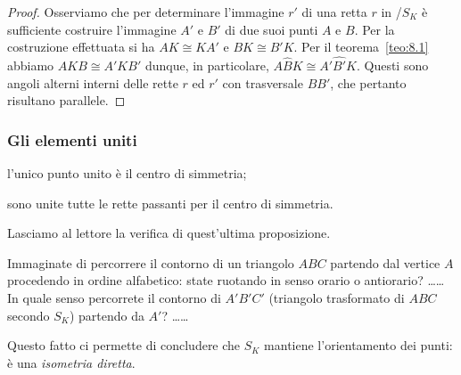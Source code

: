 \noindent\begin{minipage}{0.65\textwidth}\parindent15pt
\begin{proof}
Osserviamo che per determinare l'immagine \(r'\) di una retta \(r\) in 
/\(S_K\) è sufficiente costruire l'immagine \(A'\) e \(B'\) di due suoi 
punti \(A\) e \(B\). Per la costruzione effettuata si ha \(AK\cong KA'\) e 
\(BK\cong B'K\). Per il teorema~\ref{teo:8.1} abbiamo \(AKB\cong A'KB'\) 
dunque, in particolare, \(A\widehat{B}K\cong A'\widehat{B'}K\). Questi 
sono angoli alterni interni delle rette \(r\) ed \(r'\) con trasversale 
\(BB'\), che pertanto risultano parallele.
\end{proof}
\end{minipage}\hfil
\begin{minipage}{0.35\textwidth}
	
\centering
\end{minipage}\vspace{8pt}

\subsubsection{Gli elementi uniti}
\begin{itemize*}
\item l'unico punto unito è il centro di simmetria;
\item sono unite tutte le rette passanti per il centro di simmetria.
\end{itemize*}
Lasciamo al lettore la verifica di quest'ultima 
proposizione.\vspace{8pt}

Immaginate di percorrere il contorno di un triangolo \(ABC\) partendo 
dal vertice \(A\) procedendo in ordine alfabetico: state ruotando in 
senso orario o antiorario? \ldots\ldots{} In quale senso percorrete 
il contorno di \(A'B'C'\) (triangolo trasformato di \(ABC\) secondo 
\(S_K\)) partendo da \(A'\)? \ldots\ldots{}

Questo fatto ci permette di concludere che \(S_K\) mantiene 
l'orientamento dei punti: è una \emph{isometria diretta}.

